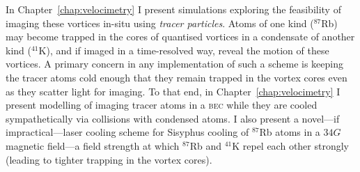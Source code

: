 In Chapter~\ref{chap:velocimetry} I present simulations exploring the feasibility of imaging these vortices in-situ using \emph{tracer particles}. Atoms of one kind ($^{87}$Rb) may become trapped in the cores of quantised vortices in a condensate of another kind ($^{41}$K), and if imaged in a time-resolved way, reveal the motion of these vortices. A primary concern in any implementation of such a scheme is keeping the tracer atoms cold enough that they remain trapped in the vortex cores even as they scatter light for imaging. To that end, in Chapter~\ref{chap:velocimetry} I present modelling of imaging tracer atoms in a \textsc{bec} while they are cooled sympathetically via collisions with condensed atoms. I also present a novel---if impractical---laser cooling scheme for Sisyphus cooling of $^{87}$Rb atoms in a $34\unit{G}$ magnetic field---a field strength at which $^{87}$Rb and $^{41}$K repel each other strongly (leading to tighter trapping in the vortex cores).



